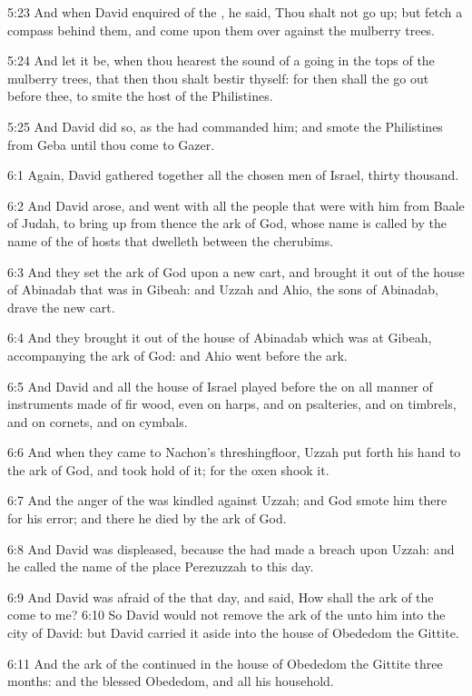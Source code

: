 5:23 And when David enquired of the \LORD, he said, Thou shalt not go
up; but fetch a compass behind them, and come upon them over against
the mulberry trees.

5:24 And let it be, when thou hearest the sound of a going in the tops
of the mulberry trees, that then thou shalt bestir thyself: for then
shall the \LORD go out before thee, to smite the host of the
Philistines.

5:25 And David did so, as the \LORD had commanded him; and smote the
Philistines from Geba until thou come to Gazer.

6:1 Again, David gathered together all the chosen men of Israel,
thirty thousand.

6:2 And David arose, and went with all the people that were with him
from Baale of Judah, to bring up from thence the ark of God, whose
name is called by the name of the \LORD of hosts that dwelleth between
the cherubims.

6:3 And they set the ark of God upon a new cart, and brought it out of
the house of Abinadab that was in Gibeah: and Uzzah and Ahio, the sons
of Abinadab, drave the new cart.

6:4 And they brought it out of the house of Abinadab which was at
Gibeah, accompanying the ark of God: and Ahio went before the ark.

6:5 And David and all the house of Israel played before the \LORD on
all manner of instruments made of fir wood, even on harps, and on
psalteries, and on timbrels, and on cornets, and on cymbals.

6:6 And when they came to Nachon's threshingfloor, Uzzah put forth his
hand to the ark of God, and took hold of it; for the oxen shook it.

6:7 And the anger of the \LORD was kindled against Uzzah; and God smote
him there for his error; and there he died by the ark of God.

6:8 And David was displeased, because the \LORD had made a breach upon
Uzzah: and he called the name of the place Perezuzzah to this day.

6:9 And David was afraid of the \LORD that day, and said, How shall the
ark of the \LORD come to me?  6:10 So David would not remove the ark of
the \LORD unto him into the city of David: but David carried it aside
into the house of Obededom the Gittite.

6:11 And the ark of the \LORD continued in the house of Obededom the
Gittite three months: and the \LORD blessed Obededom, and all his
household.

